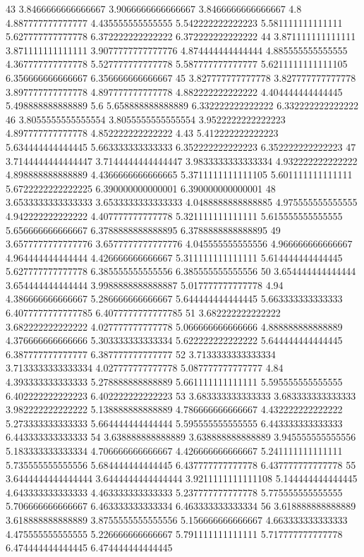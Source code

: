 43 3.8466666666666667 3.9066666666666667 3.8466666666666667 4.8 4.887777777777777 4.435555555555555 5.542222222222223 5.581111111111111 5.627777777777778 6.372222222222222 6.372222222222222
44 3.871111111111111 3.871111111111111 3.9077777777777776 4.874444444444444 4.885555555555555 4.367777777777778 5.527777777777778 5.587777777777777 5.6211111111111105 6.356666666666667 6.356666666666667
45 3.827777777777778 3.827777777777778 3.897777777777778 4.897777777777778 4.882222222222222 4.404444444444445 5.498888888888889 5.6 5.658888888888889 6.332222222222222 6.332222222222222
46 3.8055555555555554 3.8055555555555554 3.9522222222222223 4.897777777777778 4.852222222222222 4.43 5.412222222222223 5.634444444444445 5.663333333333333 6.352222222222223 6.352222222222223
47 3.7144444444444447 3.7144444444444447 3.9833333333333334 4.932222222222222 4.898888888888889 4.4366666666666665 5.3711111111111105 5.601111111111111 5.6722222222222225 6.390000000000001 6.390000000000001
48 3.6533333333333333 3.6533333333333333 4.0488888888888885 4.975555555555555 4.942222222222222 4.407777777777778 5.321111111111111 5.615555555555555 5.656666666666667 6.3788888888888895 6.3788888888888895
49 3.6577777777777776 3.6577777777777776 4.045555555555556 4.966666666666667 4.964444444444444 4.426666666666667 5.311111111111111 5.614444444444445 5.627777777777778 6.385555555555556 6.385555555555556
50 3.654444444444444 3.654444444444444 3.9988888888888887 5.017777777777778 4.94 4.386666666666667 5.286666666666667 5.644444444444445 5.663333333333333 6.4077777777777785 6.4077777777777785
51 3.682222222222222 3.682222222222222 4.027777777777778 5.066666666666666 4.888888888888889 4.376666666666666 5.303333333333334 5.622222222222222 5.644444444444445 6.387777777777777 6.387777777777777
52 3.7133333333333334 3.7133333333333334 4.027777777777778 5.087777777777777 4.84 4.393333333333333 5.278888888888889 5.661111111111111 5.595555555555555 6.402222222222223 6.402222222222223
53 3.683333333333333 3.683333333333333 3.982222222222222 5.138888888888889 4.786666666666667 4.432222222222222 5.273333333333333 5.664444444444444 5.595555555555555 6.443333333333333 6.443333333333333
54 3.638888888888889 3.638888888888889 3.945555555555556 5.183333333333334 4.706666666666667 4.426666666666667 5.241111111111111 5.735555555555556 5.684444444444445 6.437777777777778 6.437777777777778
55 3.6444444444444444 3.6444444444444444 3.9211111111111108 5.144444444444445 4.643333333333333 4.463333333333333 5.237777777777778 5.775555555555555 5.706666666666667 6.463333333333334 6.463333333333334
56 3.618888888888889 3.618888888888889 3.8755555555555556 5.156666666666667 4.663333333333333 4.475555555555555 5.226666666666667 5.791111111111111 5.717777777777778 6.474444444444445 6.474444444444445
